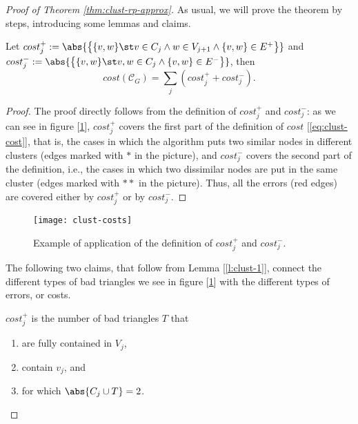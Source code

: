 \begin{proof}[Proof of Theorem \ref{thm:clust-rp-approx}]
    As usual, we will prove the theorem by steps, introducing some lemmas and claims.
    
    \begin{lem}\label{l:clust-1}
        Let $cost^+_j := \abs{\big\{ \{v,w\} \st v \in C_j \wedge w \in V_{j+1} \wedge \{v,w\} \in E^+ \big\}}$ and\\ $cost^-_j := \abs{\big\{ \{v,w\} \st v,w \in C_j \wedge \{v,w\} \in E^- \big\}}$, then
        \begin{equation}
            cost(\mathscr{C}_G) = \sum_j \left( cost_j^+ + cost_j^- \right).
        \end{equation}
    \end{lem}
    \begin{proof}
        The proof directly follows from the definition of $cost_j^+$ and $cost_j^-$: as we can see in figure [\ref{fig:clust-costs}], $cost_j^+$ covers the first part of the definition of $cost$ [\ref{eq:clust-cost}], that is, the cases in which the algorithm puts two similar nodes in different clusters (edges marked with $*$ in the picture), and $cost_j^-$ covers the second part of the definition, i.e., the cases in which two dissimilar nodes are put in the same cluster (edges marked with $**$ in the picture). Thus, all the errors (red edges) are covered either by $cost_j^+$ or by $cost_j^-$.
    \end{proof}

    \begin{figure}[h!]
        \centering
        \texttt{[image: clust-costs]}
        \caption{Example of application of the definition of $cost_j^+$ and $cost_j^-$.}
        \label{fig:clust-costs}
    \end{figure}

    The following two claims, that follow from Lemma [\ref{l:clust-1}], connect the different types of bad triangles we see in figure [\ref{fig:clust-costs}] with the different types of errors, or costs.
    
    \begin{claim}\label{cl:clust-1}
        $cost_j^+$ is the number of bad triangles $T$ that
        \begin{enumerate}
            \item are fully contained in $V_j$,
            \item contain $v_j$, and
            \item for which $\abs{C_j \cup T} = 2$.
        \end{enumerate}
    \end{claim}


\end{proof}
